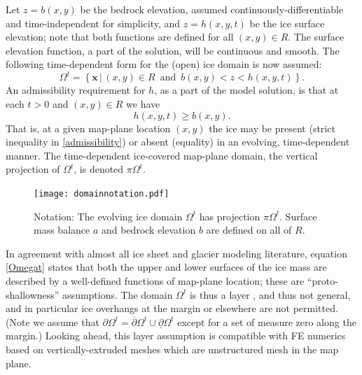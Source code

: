 \documentclass[letterpaper,final,12pt,reqno]{amsart}
\newcommand{\bx}{\mathbf{x}}
\begin{document}
Let $z=b(x,y)$ be the bedrock elevation, assumed continuously-differentiable and time-independent for simplicity, and $z=h(x,y,t)$ be the ice surface elevation; note that both functions are defined for all $(x,y)\in R$.  The surface elevation function, a part of the solution, will be continuous and smooth.  The following time-dependent form for the (open) ice domain is now assumed:
\begin{equation}
\Omega^t = \left\{\bx\,\big|\,(x,y)\in R \,\text{ and }\, b(x,y) < z < h(x,y,t)\right\}.  \label{Omegat}
\end{equation}
An admissibility requirement \cite{Bueler2016} for $h$, as a part of the model solution, is that at each $t>0$ and $(x,y)\in R$ we have
\begin{equation}
h(x,y,t) \ge b(x,y).  \label{admissibility}
\end{equation}
That is, at a given map-plane location $(x,y)$ the ice may be present (strict inequality in \eqref{admissibility}) or absent (equality) in an evolving, time-dependent manner.  The time-dependent ice-covered map-plane domain, the vertical projection of $\Omega^t$, is denoted $\pi \Omega^t$.

\begin{figure}[h]
\begin{center}
\texttt{[image: domainnotation.pdf]}
\end{center}
\caption{Notation: The evolving ice domain $\Omega^t$ has projection $\pi \Omega^t$.  Surface mass balance $a$ and bedrock elevation $b$ are defined on all of $R$.}
\label{fig:domainnotation}
\end{figure}

In agreement with almost all ice sheet and glacier modeling literature, equation \eqref{Omegat} states that both the upper and lower surfaces of the ice mass are described by a well-defined functions of map-plane location; these are ``proto-shallowness'' assumptions.  The domain $\Omega^t$ is thus a layer \cite{Bueler2020}, and thus not general, and in particular ice overhangs at the margin or elsewhere are not permitted.  (Note we assume that $\partial \Omega^t = \overline{\partial} \Omega^t \cup \underline{\partial} \Omega^t$ except for a set of measure zero along the margin.)  Looking ahead, this layer assumption is compatible with FE numerics based on vertically-extruded meshes which are unstructured mesh in the map plane.
\end{document}
